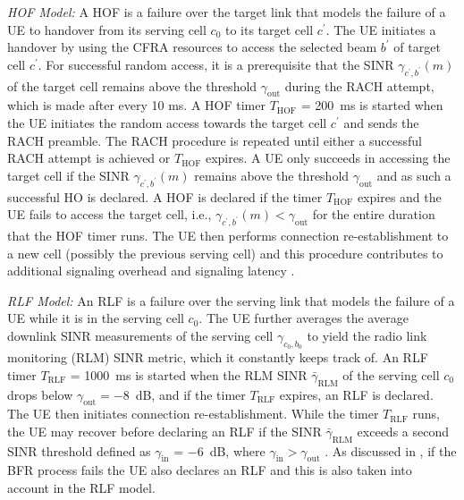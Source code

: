 \documentclass[10pt, conference]{IEEEtran}
\begin{document}
\textit{HOF Model:} A HOF is a failure over the target link that models the failure of a UE to handover from its serving cell $c_0$ to its target cell $c^{\prime}$. The UE initiates a handover by using the CFRA resources to access the selected beam $b^{\prime}$ of target cell $c^{\prime}$. For successful random access, it is a prerequisite that the SINR $\gamma_{c^{\prime},b^{\prime}}(m)$ of the target cell remains above the threshold $\gamma_\mathrm{out}$ during the RACH attempt, which is made after every 10 ms. A HOF timer $T_\mathrm{HOF} $ = \SI{200}{ms} is started when the UE initiates the random access towards the target cell $c^{\prime}$ and sends the RACH preamble. The RACH procedure is repeated until either a successful RACH attempt is achieved or $T_\mathrm{HOF}$ expires. A UE only succeeds in accessing the target cell if the SINR  $\gamma_{c^{\prime},b^{\prime}}(m)$ remains above the threshold $\gamma_\mathrm{out}$ and as such a successful HO is declared. A HOF is declared if the timer $T_\mathrm{HOF}$ expires and the UE fails to access the target cell, i.e., $\gamma_{c^{\prime},b^{\prime}}(m)<\gamma_\mathrm{out}$ for the entire duration that the HOF timer runs. The UE then performs connection re-establishment to a new cell (possibly the previous serving cell) and this procedure contributes to additional signaling overhead and signaling latency \cite{b7}. 

\textit{RLF Model:} An RLF is a failure over the serving link that models the failure of a UE while it is in the serving cell $c_0$. The UE further averages the average downlink SINR measurements of the serving cell $\gamma_{c_0,b_0}$ to yield the radio link monitoring (RLM) SINR metric, which it constantly keeps track of. An RLF timer $T_\mathrm{RLF}$ = \SI{1000}{ms} is started when the RLM SINR $\bar{\gamma}_\mathrm{RLM}$ of the serving cell $c_0$ drops below $\gamma_\mathrm{out} = $\SI{-8}{dB}, and if the timer $T_\mathrm{RLF}$ expires, an RLF is declared. The UE then initiates connection re-establishment. While the timer $T_\mathrm{RLF}$ runs, the UE may recover before declaring an RLF if the SINR $\bar{\gamma}_\mathrm{RLM}$ exceeds a second SINR threshold defined as $\gamma_\mathrm{in}$ = \SI{-6}{dB}, where $\gamma_\mathrm{in} > \gamma_\mathrm{out}$ \cite{b7}. As discussed in , if the BFR process fails the UE also declares an RLF and this is also taken into account in the RLF model.
\end{document}
